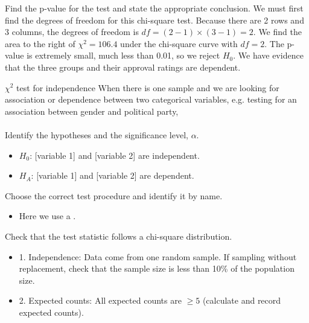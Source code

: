 \begin{examplewrap}
\begin{nexample}{Find the p-value for the test and state the appropriate conclusion.}
We must first find the degrees of freedom for this chi-square test.  Because there are 2 rows and 3 columns, the degrees of freedom is $df=(2-1)\times (3-1) = 2$. We find the area to the right of $\chi^2=106.4$ under the chi-square curve with $df=2$.  The p-value is extremely small, much less than 0.01, so we reject $H_0$.  We have evidence that the three groups and their approval ratings are dependent.  
\end{nexample}
\end{examplewrap}




\begin{onebox}{$\chi^2$ test for independence}
When there is one sample and we are looking for association or dependence between two categorical variables, e.g. testing for an association between gender and political party,
\\
\\
 Identify the hypotheses and the significance level, $\alpha$.  \vspace{-1mm}
\begin{itemize}
\setlength{\itemsep}{0mm}
\item[] $H_0$: [variable 1] and [variable 2] are independent.
\item[] $H_A$: [variable 1] and [variable 2] are dependent.
\end{itemize}
 Choose the correct test procedure and identify it by name.\vspace{-1mm}
\begin{itemize}
\item[]  Here we use a .
\end{itemize}
 Check that the test statistic follows a chi-square distribution.\vspace{-1mm}
\begin{itemize}
\setlength{\itemsep}{0mm}
\item[] 1. Independence:  Data come from one random sample.  If sampling without replacement, check that the sample size is less than 10\% of the population size.
\item[] 2. Expected counts:  All expected counts are $\ge 5$ (calculate and record expected counts).

\end{itemize}
\end{onebox}
